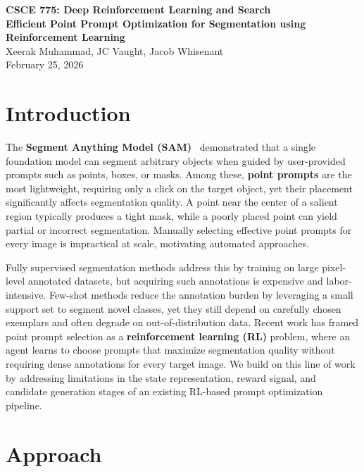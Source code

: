 \documentclass[12pt]{article}
\begin{document}
\begin{center}
{\large \textbf{CSCE 775: Deep Reinforcement Learning and Search}} \\[12pt]
{\Large \textbf{Efficient Point Prompt Optimization for Segmentation using Reinforcement Learning}} \\[12pt]
Xeerak Muhammad, JC Vaught, Jacob Whisenant \\[6pt]
February 25, 2026
\end{center}

\section{Introduction}

The \textbf{Segment Anything Model (SAM)}~\cite{Kirillov2023SAM} demonstrated that a single foundation model can segment arbitrary objects when guided by user-provided prompts such as points, boxes, or masks. Among these, \textbf{point prompts} are the most lightweight, requiring only a click on the target object, yet their placement significantly affects segmentation quality. A point near the center of a salient region typically produces a tight mask, while a poorly placed point can yield partial or incorrect segmentation. Manually selecting effective point prompts for every image is impractical at scale, motivating automated approaches.

Fully supervised segmentation methods address this by training on large pixel-level annotated datasets, but acquiring such annotations is expensive and labor-intensive. Few-shot methods reduce the annotation burden by leveraging a small support set to segment novel classes, yet they still depend on carefully chosen exemplars and often degrade on out-of-distribution data. Recent work has framed point prompt selection as a \textbf{reinforcement learning (RL)} problem, where an agent learns to choose prompts that maximize segmentation quality without requiring dense annotations for every target image. We build on this line of work by addressing limitations in the state representation, reward signal, and candidate generation stages of an existing RL-based prompt optimization pipeline.

\section{Approach}
\end{document}
